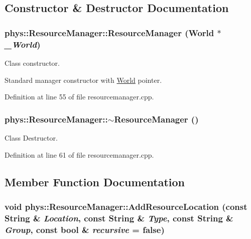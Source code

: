 \subsection{Constructor \& Destructor Documentation}
\hypertarget{classphys_1_1ResourceManager_aee07d73a8abc74398c3e0a1d62195fc9}{
\subsubsection[{ResourceManager}]{\setlength{\rightskip}{0pt plus 5cm}phys::ResourceManager::ResourceManager ({\bf World} $\ast$ {\em \_\-World})}}
\label{d1/d35/classphys_1_1ResourceManager_aee07d73a8abc74398c3e0a1d62195fc9}


Class constructor. 

Standard manager constructor with \hyperlink{classphys_1_1World}{World} pointer. 

Definition at line 55 of file resourcemanager.cpp.

\hypertarget{classphys_1_1ResourceManager_a426d4d684a9ecf98359362243ce01072}{
\subsubsection[{$\sim$ResourceManager}]{\setlength{\rightskip}{0pt plus 5cm}phys::ResourceManager::$\sim$ResourceManager ()}}
\label{d1/d35/classphys_1_1ResourceManager_a426d4d684a9ecf98359362243ce01072}
Class Destructor. 

Definition at line 61 of file resourcemanager.cpp.



\subsection{Member Function Documentation}
\hypertarget{classphys_1_1ResourceManager_a0d7d3adce2ad4c70a3e867396e17b090}{
\subsubsection[{AddResourceLocation}]{\setlength{\rightskip}{0pt plus 5cm}void phys::ResourceManager::AddResourceLocation (const {\bf String} \& {\em Location}, \/  const {\bf String} \& {\em Type}, \/  const {\bf String} \& {\em Group}, \/  const bool \& {\em recursive} = {\ttfamily false})}}
\label{d1/d35/classphys_1_1ResourceManager_a0d7d3adce2ad4c70a3e867396e17b090}


